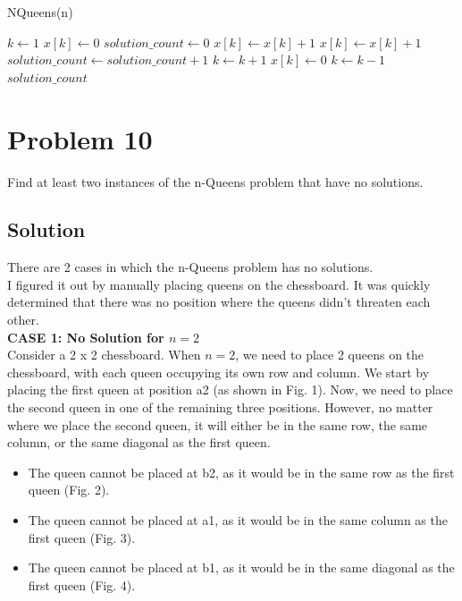 \documentclass[12pt]{article}
\begin{document}
\begin{algorithm}
    \caption{NQueens(n)}
    \begin{algorithmic}[1]
        \State $k \gets 1$
        \State $x[k] \gets 0$
        \State $solution\_count \gets 0$ 
            \State $x[k] \gets x[k] + 1$
                \State $x[k] \gets x[k] + 1$
            \EndWhile
                    \State $solution\_count \gets solution\_count + 1$ 
                \Else
                    \State $k \gets k + 1$
                    \State $x[k] \gets 0$
                \EndIf
            \Else
                \State $k \gets k - 1$
            \EndIf
        \EndWhile
        \State \Return $solution\_count$ 
    \end{algorithmic}
    \end{algorithm}
\section*{Problem 10}
Find at least two instances of the n-Queens problem that have no solutions.
\subsection*{Solution}
There are 2 cases in which the n-Queens problem has no solutions.\\
I figured it out by manually placing queens on the chessboard. It was quickly determined that there was no position where the queens didn't threaten each other.\\

\textbf{CASE 1: No Solution for $n = 2$} \\[12pt]

Consider a 2 x 2 chessboard. When $n = 2$, we need to place 2 queens on the chessboard, with each queen occupying its own row and column. We start by placing the first queen at position a2 (as shown in Fig. 1). Now, we need to place the second queen in one of the remaining three positions. However, no matter where we place the second queen, it will either be in the same row, the same column, or the same diagonal as the first queen.

\begin{itemize}
    \item The queen cannot be placed at b2, as it would be in the same row as the first queen (Fig. 2).
    \item The queen cannot be placed at a1, as it would be in the same column as the first queen (Fig. 3).
    \item The queen cannot be placed at b1, as it would be in the same diagonal as the first queen (Fig. 4).
\end{itemize}
\end{document}
